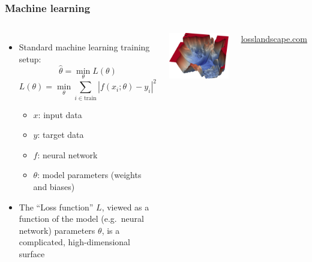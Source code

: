 \documentclass[aspectratio=169]{beamer}
\begin{document}
\begin{frame}
    \frametitle{Machine learning}
    \begin{columns}
        \begin{itemize}
            \item Standard machine learning training setup:
                \[ \hat{\theta} = \min_\theta L(\theta) \]
                \[ L(\theta) = \min_{\theta} \sum_{i\in\text{train}} |f(x_i;\theta)-y_i|^2 \]
                \begin{itemize}
                    \item $x$: input data
                    \item $y$: target data
                    \item $f$: neural network
                    \item $\theta$: model parameters (weights and biases)
                \end{itemize}
            \item The ``Loss function'' $L$, viewed as a function of the model (e.g.\ neural network) parameters $\theta$, is a complicated, high-dimensional surface
        \end{itemize}
        
        \includegraphics[width=\textwidth]{figures/loss_landscape}

        \hfill\href{https://losslandscape.com}{losslandscape.com}
    \end{columns}
\end{frame}
\end{document}
